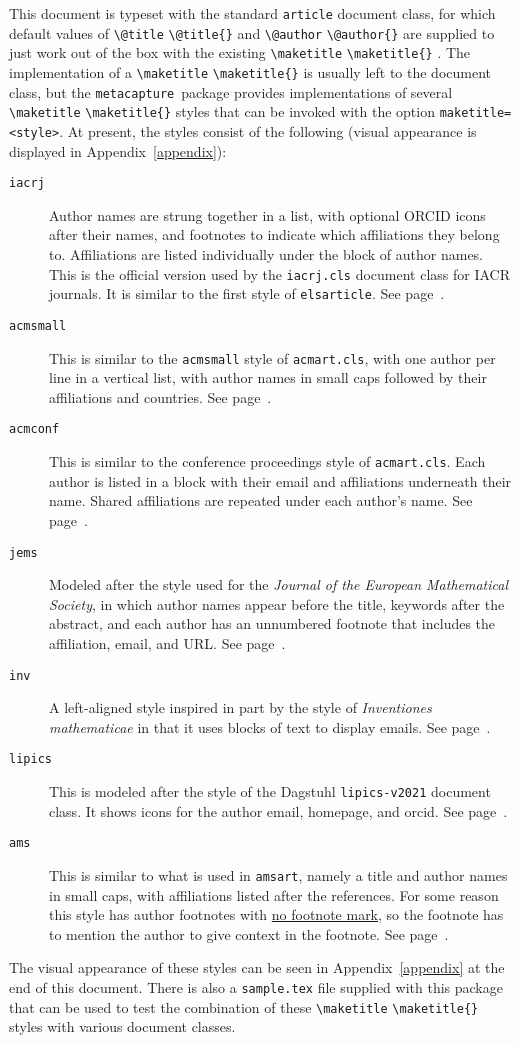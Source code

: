 \documentclass{article}
\newcommand{\pkgname}{\texttt{metacapture}}
\newcommand{\cmd}[2][]{%
  \def\FirstArg{#1}%
  \ifx\FirstArg\empty%
    \texttt{\textbackslash{}#2}%
  \else%
    \texttt{\textbackslash{}#2\{#1\}}%
  \fi
}
\begin{document}
This document is typeset with the standard \texttt{article} document
class, for which default values of \cmd{@title} and \cmd{@author} are supplied to just
work out of the box with the existing \cmd{maketitle}. The
implementation of a \cmd{maketitle} is usually left to the document
class, but the \pkgname\ package provides implementations of
several \cmd{maketitle} styles that can be invoked with the option
\texttt{maketitle=\textless{style}\textgreater}. 
At present, the styles consist of the following (visual appearance
is displayed in Appendix~\ref{appendix}):
\begin{description}
\item[\texttt{iacrj}] Author names are strung together in a list, with
optional ORCID icons after their names, and footnotes to indicate
which affiliations they belong to. Affiliations are listed
individually under the block of author names.  This is the official
version used by the \texttt{iacrj.cls} document class for IACR
journals. It is similar to the first style of \texttt{elsarticle}. See page~\pageref{iacrj}.
\item[\texttt{acmsmall}] This is similar to the \texttt{acmsmall} style of \texttt{acmart.cls},
with one author per line in a vertical list, with author names in small caps followed
by their affiliations and countries. See page~\pageref{acmsmall}.
\item[\texttt{acmconf}] This is similar to the conference proceedings style
of \texttt{acmart.cls}. Each author is listed in a block with their email and
affiliations underneath their name. Shared affiliations are repeated under each author's name.
See page~\pageref{acmconf}.
\item[\texttt{jems}] Modeled after the style used for the {\em Journal of the European Mathematical Society},
in which author names appear before the title, keywords after the
abstract, and each author has an unnumbered footnote that includes the
affiliation, email, and URL. See page~\pageref{jems}.
\item[\texttt{inv}] A left-aligned style inspired in part by the style
of {\em Inventiones mathematicae} in that it uses blocks of text to display
emails. See page~\pageref{inv}.
\item[\texttt{lipics}] This is modeled after the style of the Dagstuhl \texttt{lipics-v2021} document
class. It shows icons for the author email, homepage, and orcid. See page~\pageref{lipics}.
\item[\texttt{ams}] This is similar to what is used in \texttt{amsart}, namely
a title and author names in small caps, with affiliations listed after
the references. For some reason this style has author footnotes
with \href{https://ctan.math.washington.edu/tex-archive/info/amscls-doc/Author_Handbook_Journals.pdf}{no
footnote mark}, so the footnote has to mention the author to give
context in the footnote. See page~\pageref{ams}.
\end{description}
The visual appearance of these styles can be seen in Appendix~\ref{appendix} at
the end of this document.
There is also a \texttt{sample.tex} file supplied with this package that
can be used to test the combination of these \cmd{maketitle} styles
with various document classes.
\end{document}
